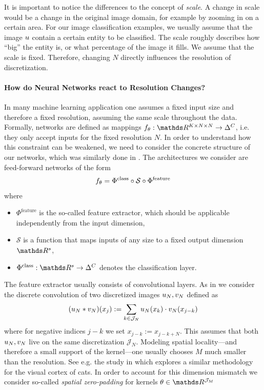 It is important to notice the differences to the concept of \emph{scale}. A change in scale would be a change in the original image domain, for example by zooming in on a certain area. For our image classification examples, we usually assume that the image $u$ contain a certain entity to be classified. The scale roughly describes how \enquote{big} the entity is, or what percentage of the image it fills. We assume that the scale is fixed. Therefore, changing $N$ directly influences the resolution of discretization.

\paragraph{How do Neural Networks react to Resolution Changes?} In many machine learning application one assumes a fixed input size and therefore a fixed resolution, assuming the same scale throughout the data. Formally, networks are defined as mappings $\net_\param:\R^{K\times N\times N}\to\Delta^C$, i.e. they only accept inputs for the fixed resolution $N$. In order to understand how this constraint can be weakened, we need to consider the concrete structure of our networks, which was similarly done in \cite{kovachki2021universal, kabri2022FNO}. The architectures we consider are feed-forward networks of the form
%
\begin{align*}
f_\theta = \Phi^{\text{class}} \circ \mathcal{S}\circ \Phi^{\text{feature}}
\end{align*}
%
where 
%
\begin{itemize}
\item $\Phi^{\text{feature}}$ is the so-called feature extractor, which should be applicable independently from the input dimension,
\item $\mathcal{S}$ is a function that maps inputs of any size to a fixed output dimension $\R^s$,
\item $\Phi^{\text{class}}:\R^s\to\Delta^C$ denotes the classification layer.
\end{itemize}
%
%
%
The feature extractor usually consists of convolutional layers. As in \cite[Ch. 2]{kabri2022FNO} we consider the discrete convolution of two discretized images $u_N, v_N$ defined as 
%
\begin{align*}
(u_N\ast v_N)(x_j) := \sum_{k\in \mathcal{J}_N} u_N(x_k)\cdot v_N(x_{j-k})
\end{align*}
%
where for negative indices $j-k$ we set $x_{j-k} := x_{j-k+N}$. This assumes that both $u_N, v_N$ live on the same discretization $\mathcal{J}_N$. Modeling spatial locality---and therefore a small support of the kernel---one usually chooses $M$ much smaller than the resolution. See e.g. the study in \cite{hubel1962receptive} which explores a similar methodology for the visual cortex of cats. In order to account for this dimension mismatch we consider so-called \emph{spatial zero-padding} for kernels $\param\in\R^{\mathcal{J}_M}$
